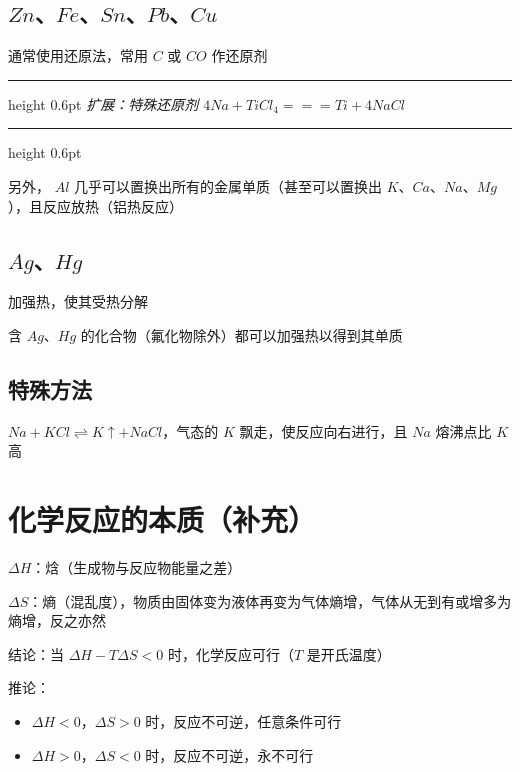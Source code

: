 \documentclass[UTF8,zihao=-4,openany]{ctexbook}
\newenvironment{notebox}
  {\par\smallskip\noindent\begingroup\begin{minipage}{\linewidth}\color{noteframe}\hrule height 0.6pt\smallskip\color{black}\itshape}
  {\par\smallskip\color{noteframe}\hrule height 0.6pt\end{minipage}\endgroup\par\smallskip}
\begin{document}
\subsection{$Zn$、$Fe$、$Sn$、$Pb$、$Cu$}
通常使用还原法，常用 $C$ 或 $CO$ 作还原剂\par
\begin{notebox}
扩展：特殊还原剂 $4Na+TiCl_4=\!=\!=Ti+4NaCl$\par
\end{notebox}
另外， $Al$ 几乎可以置换出所有的金属单质（甚至可以置换出 $K$、$Ca$、$Na$、$Mg$），且反应放热（铝热反应）\par
\subsection{$Ag$、$Hg$}
加强热，使其受热分解\par

含 $Ag$、$Hg$ 的化合物（氟化物除外）都可以加强热以得到其单质\par
\subsection{特殊方法}
$Na+KCl\rightleftharpoons K\uparrow +NaCl$，气态的 $K$ 飘走，使反应向右进行，且 $Na$ 熔沸点比 $K$ 高\par

\section{化学反应的本质（补充）}
$\Delta H$：焓（生成物与反应物能量之差）\par

$\Delta S$：熵（混乱度），物质由固体变为液体再变为气体熵增，气体从无到有或增多为熵增，反之亦然\par

结论：当 $\Delta H-T \Delta S<0$ 时，化学反应可行（$T$ 是开氏温度）\par

推论：\par

\begin{itemize}
\item $\Delta H<0$，$\Delta S>0$ 时，反应不可逆，任意条件可行
\end{itemize}

\begin{itemize}
\item $\Delta H>0$，$\Delta S<0$ 时，反应不可逆，永不可行
\end{itemize}
\end{document}
